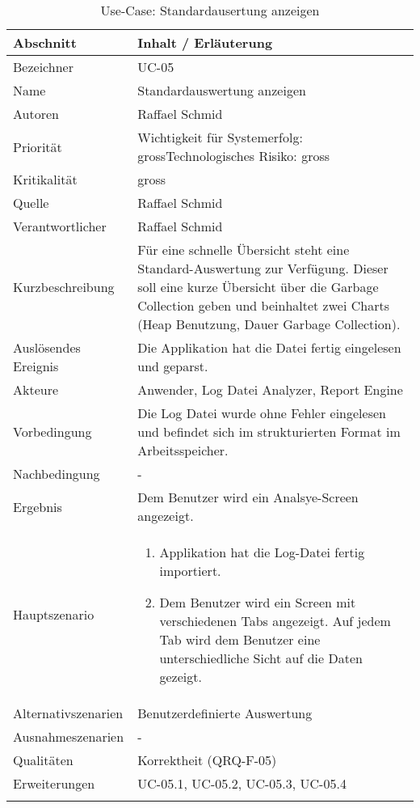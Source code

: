 \begin{longtable}{|p{4cm}|p{10.5cm}|}
\hline
   \textbf{Abschnitt} & \textbf{Inhalt / Erläuterung} \\\hline
   Bezeichner & UC-05\\\hline
   Name & Standardauswertung anzeigen\\\hline
   Autoren & Raffael Schmid\\\hline
   Priorität & Wichtigkeit für Systemerfolg: gross\newline Technologisches Risiko: gross\\\hline
   Kritikalität & gross\\\hline
   Quelle & Raffael Schmid\\\hline
   Verantwortlicher & Raffael Schmid\\\hline
   Kurzbeschreibung & Für eine schnelle Übersicht steht eine Standard-Auswertung zur Verfügung. Dieser soll eine kurze Übersicht über die Garbage Collection geben und beinhaltet zwei Charts (Heap Benutzung, Dauer Garbage Collection). \\\hline
   Auslösendes Ereignis & Die Applikation hat die Datei fertig eingelesen und geparst.\\\hline
   Akteure & Anwender, Log Datei Analyzer, Report Engine\\\hline
   Vorbedingung & Die Log Datei wurde ohne Fehler eingelesen und befindet sich im strukturierten Format im Arbeitsspeicher.\\\hline
   Nachbedingung & -\\\hline
   Ergebnis & Dem Benutzer wird ein Analsye-Screen angezeigt.\\\hline
   Hauptszenario & 
	\begin{enumerate}
		\item Applikation hat die Log-Datei fertig importiert.
		\item Dem Benutzer wird ein Screen mit verschiedenen Tabs angezeigt. Auf jedem Tab wird dem Benutzer eine unterschiedliche Sicht auf die Daten gezeigt.
	\end{enumerate}
	\\\hline
   Alternativszenarien & Benutzerdefinierte Auswertung\\\hline
   Ausnahmeszenarien & -\\\hline
   Qualitäten & Korrektheit (QRQ-F-05)\\\hline
   Erweiterungen & UC-05.1, UC-05.2, UC-05.3, UC-05.4 \\\hline
\caption{Use-Case: Standardausertung anzeigen}
\end{longtable}


